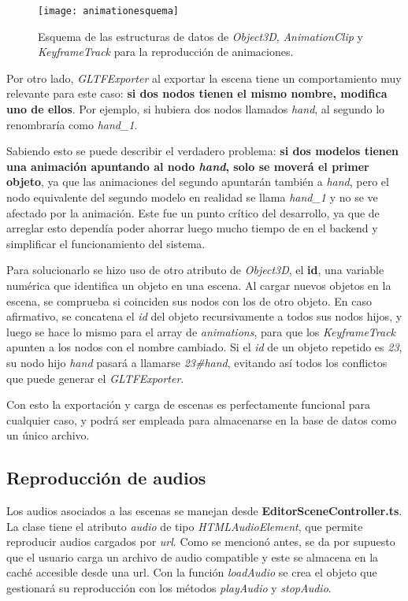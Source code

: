 \begin{figure}[h]
    \centering
    \texttt{[image: animationesquema]}
    \caption[Esquema de estructura de datos para animaciones]{Esquema de las estructuras de datos de \textit{Object3D}, \textit{AnimationClip} y \textit{KeyframeTrack} para la reproducción de animaciones.}
    \label{fig:animationesquema}
\end{figure}

Por otro lado, \textit{GLTFExporter} al exportar la escena tiene un comportamiento muy relevante para este caso: \textbf{si dos nodos tienen el mismo nombre, modifica uno de ellos}. Por ejemplo, si hubiera dos nodos llamados \textit{hand}, al segundo lo renombraría como \textit{hand\_1}.

Sabiendo esto se puede describir el verdadero problema: \textbf{si dos modelos tienen una animación apuntando al nodo \textit{hand}, solo se moverá el primer objeto}, ya que las animaciones del segundo apuntarán también a \textit{hand}, pero el nodo equivalente del segundo modelo en realidad se llama \textit{hand\_1} y no se ve afectado por la animación. Este fue un punto crítico del desarrollo, ya que de arreglar esto dependía poder ahorrar luego mucho tiempo de en el backend y simplificar el funcionamiento del sistema. 

Para solucionarlo se hizo uso de otro atributo de \textit{Object3D}, el \textbf{id}, una variable numérica que identifica un objeto en una escena. Al cargar nuevos objetos en la escena, se comprueba si coinciden sus nodos con los de otro objeto. En caso afirmativo, se concatena el \textit{id} del objeto recursivamente a todos sus nodos hijos, y luego se hace lo mismo para el array de \textit{animations}, para que los \textit{KeyframeTrack} apunten a los nodos con el nombre cambiado. Si el \textit{id} de un objeto repetido es \textit{23}, su nodo hijo \textit{hand} pasará a llamarse \textit{23\#hand}, evitando así todos los conflictos que puede generar el \textit{GLTFExporter}.

Con esto la exportación y carga de escenas es perfectamente funcional para cualquier caso, y podrá ser empleada para almacenarse en la base de datos como un único archivo.

\subsection{Reproducción de audios}

Los audios asociados a las escenas se manejan desde \textbf{EditorSceneController.ts}. La clase tiene el atributo \textit{audio} de tipo \textit{HTMLAudioElement}, que permite reproducir audios cargados por \textit{url}. Como se mencionó antes, se da por supuesto que el usuario carga un archivo de audio compatible y este se almacena en la caché accesible desde una url. Con la función \textit{loadAudio} se crea el objeto que gestionará su reproducción con los métodos \textit{playAudio} y \textit{stopAudio}.

